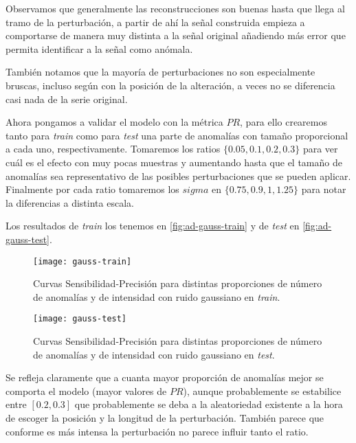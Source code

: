 Observamos que generalmente las reconstrucciones son buenas hasta que llega al tramo de la perturbación, a partir de ahí la señal construida empieza a comportarse de manera muy distinta a la señal original añadiendo más error que permita identificar a la señal como anómala.

También notamos que la mayoría de perturbaciones no son especialmente bruscas, incluso según con la posición de la alteración, a veces no se diferencia casi nada
de la serie original.

Ahora pongamos a validar el modelo con la métrica $PR$, para ello crearemos tanto para \emph{train} como para \emph{test} una parte de anomalías con tamaño proporcional a cada uno, respectivamente. Tomaremos los ratios $\{0.05, 0.1, 0.2, 0.3\}$ para ver cuál es el efecto con muy pocas muestras y aumentando hasta que el tamaño de anomalías sea representativo de las posibles perturbaciones que se pueden aplicar. Finalmente por cada ratio tomaremos los $sigma$ en $\{0.75, 0.9, 1, 1.25\}$ para notar la diferencias a distinta escala.

Los resultados de \emph{train} los tenemos en \autoref{fig:ad-gauss-train} y de \emph{test} en \autoref{fig:ad-gauss-test}.

\begin{figure}[htpb]
  \centering
  \texttt{[image: gauss-train]}
  \caption{Curvas Sensibilidad-Precisión para distintas proporciones de número de anomalías y de intensidad con ruido gaussiano en \emph{train}.}
  \label{fig:ad-gauss-train}
\end{figure}

\begin{figure}[htpb]
  \centering
  \texttt{[image: gauss-test]}
  \caption{Curvas Sensibilidad-Precisión para distintas proporciones de número de anomalías y de intensidad con ruido gaussiano en \emph{test}.}
  \label{fig:ad-gauss-test}
\end{figure}

Se refleja claramente que a cuanta mayor proporción de anomalías mejor se comporta el modelo (mayor valores de $PR$), aunque probablemente se estabilice entre $[0.2, 0.3]$ que probablemente se deba a la aleatoriedad existente a la hora de escoger la posición y la longitud de la perturbación. También parece que conforme es más intensa la perturbación no parece influir tanto el ratio.

